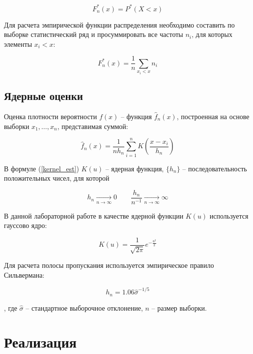 \documentclass[12pt]{article}
\begin{document}
\begin{flushleft}
        $$
            F^*_n(x) = P^*(X < x)
            \label{ecdf1}
        $$

        Для расчета эмпирической функции распределения необходимо составить по выборке статистический ряд и просуммировать все частоты $n_i$, для которых элементы $x_i < x$:

        \begin{equation}
            F^*_n(x) = \frac{1}{n} \sum_{x_i < x} n_i
            \label{ecdf2}
        \end{equation}

    \subsection{Ядерные оценки}

        Оценка плотности вероятности $f(x)$ -- функция $\hat{f}_n(x)$, построенная на основе выборки $x_1, \dots, x_n$, представимая суммой:
        
        \begin{equation}
            \hat{f}_n(x) = \frac{1}{nh_n} \sum_{i = 1}^nK(\frac{x - x_i}{h_n})
            \label{kernel_est}
        \end{equation}

        В формуле (\ref{kernel_est}) $K(u)$ -- ядерная функция, $\{h_n\}$ -- последовательность положительных чисел, для которой

        $$
            h_n \xrightarrow[n \to \infty]{} 0 \qquad \frac{h_n}{n^{-1}} \xrightarrow[n \to \infty]{} \infty
        $$

       В данной лабораторной работе в качестве ядерной функции $K(u)$ используется гауссово ядро:

       \begin{equation}
           K(u) = \frac{1}{\sqrt{2\pi}}e^{-\frac{u^2}{2}}
           \label{guss_kernel}
       \end{equation}

       Для расчета полосы пропускания используется эмпирическое правило Сильвермана:\cite{theory2}

       \begin{equation}
           h_n = 1.06 \hat{\sigma}^{-1/5}
           \label{silverman}
       \end{equation}

       , где $\hat{\sigma}$ -- стандартное выборочное отклонение, $n$ -- размер выборки.

\newpage

\section{Реализация}


\end{flushleft}
\end{document}
